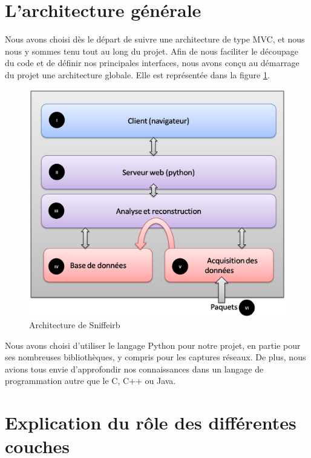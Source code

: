 

\section{L'architecture générale}

Nous avons choisi dès le départ de suivre une architecture de type MVC, et nous nous y sommes tenu tout au long du projet. Afin de nous faciliter le découpage du code et de définir nos principales interfaces, nous
avons conçu au démarrage du projet une architecture globale. Elle est représentée dans la figure \ref{Architecture}.

\begin{figure}[h!]
\centering
\includegraphics[scale=0.5]{Archi.png}
\caption{Architecture de Sniffeirb}
\label{Architecture}
\end{figure}

Nous avons choisi d'utiliser le langage Python pour notre projet, en partie pour ses nombreuses bibliothèques, y compris pour les captures réseaux. De plus, nous avions tous envie d'approfondir nos connaissances dans 
un langage de programmation autre que le C, C++ ou Java.

\section{Explication du rôle des différentes couches}

